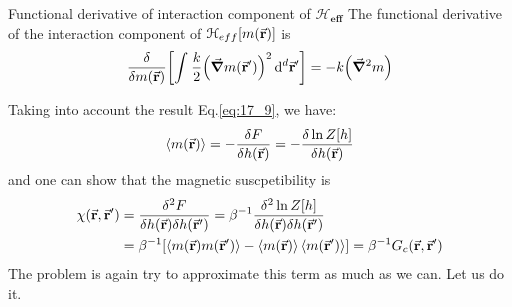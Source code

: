 \documentclass[../main/main.tex]{subfiles}
\begin{document}
\begin{example}{Functional derivative of interaction component of \( \pmb{\mathcal{H}_{eff} } \)}{}
The functional derivative of the interaction component of \( \mathcal{H}_{eff} [m (\va{r})]\) is
  \begin{equation}
    \frac{\delta }{\delta m (\va{r})} \qty[ \int_{}^{}  \frac{k }{2} \qty(\va{\grad } m (\va{r}'))^2  \dd[d]{\va{r}'}     ]  =- k \qty(\va{\grad } ^2 m )
    \label{eq:17_9}
  \end{equation}
\end{example}
Taking into account the result Eq.\eqref{eq:17_9}, we have:
\begin{equation}
  \expval{m(\va{r})} = - \frac{\delta F}{\delta h (\va{r})} = - \frac{\delta \ln{Z[h]} }{\delta h (\va{r})}
\end{equation}
and one can show that the magnetic suscpetibility is
\begin{equation}
\begin{split}
  \chi  (\va{r},\va{r}') & = \frac{\delta ^2 F}{\delta h(\va{r}) \delta h(\va{r}')}
  = \beta ^{-1} \frac{\delta ^2 \ln{Z[h]} }{\delta h (\va{r}) \delta h (\va{r}')}\\
  & = \beta ^{-1} \qty[ \expval{m(\va{r}) m (\va{r}')} - \expval{m (\va{r})} \expval{m(\va{r}')}  ]
   = \beta ^{-1} G_c (\va{r},\va{r}')
\end{split}
\end{equation}
The problem is again try to approximate this term as much as we can. Let us do it.
\end{document}
